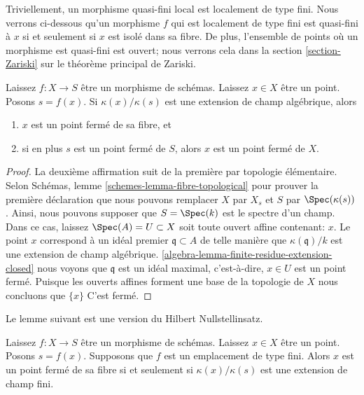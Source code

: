 \noindent
Triviellement, un morphisme quasi-fini local est localement de type fini. Nous verrons ci-dessous qu'un morphisme $f$ qui est localement de type fini est quasi-fini à $x$ si et seulement si $x$ est isolé dans sa fibre. De plus, l'ensemble de points où un morphisme est quasi-fini est ouvert; nous verrons cela dans la section \ref{section-Zariski} sur le théorème principal de Zariski.

\begin{lemma}

\label{lemma-algebraic-residue-field-extension-closed-point-fibre}
Laissez $f : X \to S$ être un morphisme de schémas. Laissez $x \in X$ être un point. Posons $s = f(x)$. Si $\kappa(x)/\kappa(s)$ est une extension de champ algébrique, alors
\begin{enumerate}
\item $x$ est un point fermé de sa fibre, et
\item si en plus $s$ est un point fermé de $S$, alors $x$ est un point fermé de $X$.
\end{enumerate}

\end{lemma}

\begin{proof}

La deuxième affirmation suit de la première par topologie élémentaire. Selon Schémas, lemme \ref{schemes-lemma-fibre-topological}
pour prouver la première déclaration que nous pouvons remplacer $X$ par $X_s$ et $S$ par $\Spec(\kappa(s))$. Ainsi, nous pouvons supposer que $S = \Spec(k)$ est le spectre d'un champ. Dans ce cas, laissez $\Spec(A) = U \subset X$ soit toute ouvert affine contenant: $x$. Le point $x$ correspond à un idéal premier
$\mathfrak q \subset A$ de telle manière que $\kappa(\mathfrak q)/k$
est une extension de champ algébrique. \ref{algebra-lemma-finite-residue-extension-closed}
nous voyons que $\mathfrak q$ est un idéal maximal, c'est-à-dire, $x \in U$ est un point fermé. Puisque les ouverts affines forment une base de la topologie de $X$ nous concluons que $\{x\}$ C'est fermé.

\end{proof}

\noindent
Le lemme suivant est une version du Hilbert Nullstellinsatz.

\begin{lemma}

\label{lemma-closed-point-fibre-locally-finite-type}
Laissez $f : X \to S$ être un morphisme de schémas. Laissez $x \in X$ être un point. Posons $s = f(x)$. Supposons que $f$ est un emplacement de type fini. Alors $x$ est un point fermé de sa fibre si et seulement si $\kappa(x)/\kappa(s)$ est une extension de champ fini.
\end{lemma}

